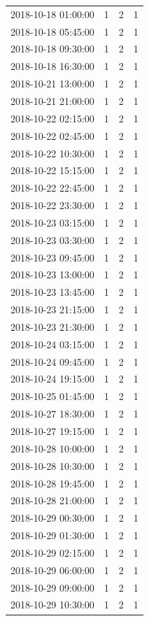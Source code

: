 \begin{tabular}{lrrr}
2018-10-18 01:00:00 & 1 & 2 & 1 \\
2018-10-18 05:45:00 & 1 & 2 & 1 \\
2018-10-18 09:30:00 & 1 & 2 & 1 \\
2018-10-18 16:30:00 & 1 & 2 & 1 \\
2018-10-21 13:00:00 & 1 & 2 & 1 \\
2018-10-21 21:00:00 & 1 & 2 & 1 \\
2018-10-22 02:15:00 & 1 & 2 & 1 \\
2018-10-22 02:45:00 & 1 & 2 & 1 \\
2018-10-22 10:30:00 & 1 & 2 & 1 \\
2018-10-22 15:15:00 & 1 & 2 & 1 \\
2018-10-22 22:45:00 & 1 & 2 & 1 \\
2018-10-22 23:30:00 & 1 & 2 & 1 \\
2018-10-23 03:15:00 & 1 & 2 & 1 \\
2018-10-23 03:30:00 & 1 & 2 & 1 \\
2018-10-23 09:45:00 & 1 & 2 & 1 \\
2018-10-23 13:00:00 & 1 & 2 & 1 \\
2018-10-23 13:45:00 & 1 & 2 & 1 \\
2018-10-23 21:15:00 & 1 & 2 & 1 \\
2018-10-23 21:30:00 & 1 & 2 & 1 \\
2018-10-24 03:15:00 & 1 & 2 & 1 \\
2018-10-24 09:45:00 & 1 & 2 & 1 \\
2018-10-24 19:15:00 & 1 & 2 & 1 \\
2018-10-25 01:45:00 & 1 & 2 & 1 \\
2018-10-27 18:30:00 & 1 & 2 & 1 \\
2018-10-27 19:15:00 & 1 & 2 & 1 \\
2018-10-28 10:00:00 & 1 & 2 & 1 \\
2018-10-28 10:30:00 & 1 & 2 & 1 \\
2018-10-28 19:45:00 & 1 & 2 & 1 \\
2018-10-28 21:00:00 & 1 & 2 & 1 \\
2018-10-29 00:30:00 & 1 & 2 & 1 \\
2018-10-29 01:30:00 & 1 & 2 & 1 \\
2018-10-29 02:15:00 & 1 & 2 & 1 \\
2018-10-29 06:00:00 & 1 & 2 & 1 \\
2018-10-29 09:00:00 & 1 & 2 & 1 \\
2018-10-29 10:30:00 & 1 & 2 & 1 \\

\end{tabular}
